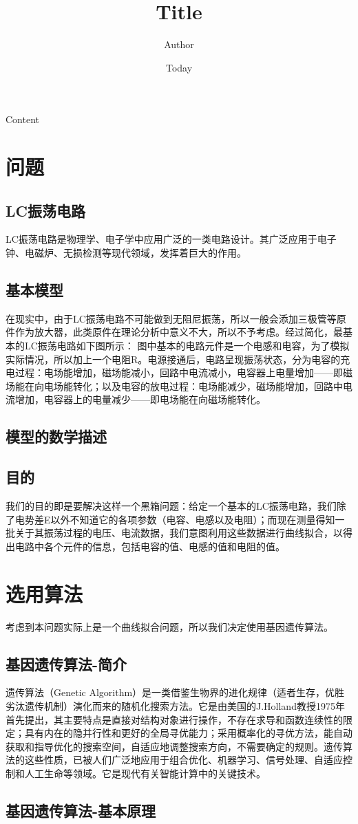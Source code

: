 \documentclass[a4paper]{article}
\begin{document}
\title{Title}
\author{Author}
\date{Today}
\maketitle

Content
\section{问题}
\subsection{LC振荡电路}
LC振荡电路是物理学、电子学中应用广泛的一类电路设计。其广泛应用于电子钟、电磁炉、无损检测等现代领域，发挥着巨大的作用。
\subsection{基本模型}
在现实中，由于LC振荡电路不可能做到无阻尼振荡，所以一般会添加三极管等原件作为放大器，此类原件在理论分析中意义不大，所以不予考虑。经过简化，最基本的LC振荡电路如下图所示：
图中基本的电路元件是一个电感和电容，为了模拟实际情况，所以加上一个电阻R。电源接通后，电路呈现振荡状态，分为电容的充电过程：电场能增加，磁场能减小，回路中电流减小，电容器上电量增加——即磁场能在向电场能转化；以及电容的放电过程：电场能减少，磁场能增加，回路中电流增加，电容器上的电量减少——即电场能在向磁场能转化。
\subsection{模型的数学描述}
\subsection{目的}
我们的目的即是要解决这样一个黑箱问题：给定一个基本的LC振荡电路，我们除了电势差E以外不知道它的各项参数（电容、电感以及电阻）；而现在测量得知一批关于其振荡过程的电压、电流数据，我们意图利用这些数据进行曲线拟合，以得出电路中各个元件的信息，包括电容的值、电感的值和电阻的值。

\section{选用算法}
考虑到本问题实际上是一个曲线拟合问题，所以我们决定使用基因遗传算法。
\subsection{基因遗传算法-简介}
遗传算法（Genetic Algorithm）是一类借鉴生物界的进化规律（适者生存，优胜劣汰遗传机制）演化而来的随机化搜索方法。它是由美国的J.Holland教授1975年首先提出，其主要特点是直接对结构对象进行操作，不存在求导和函数连续性的限定；具有内在的隐并行性和更好的全局寻优能力；采用概率化的寻优方法，能自动获取和指导优化的搜索空间，自适应地调整搜索方向，不需要确定的规则。遗传算法的这些性质，已被人们广泛地应用于组合优化、机器学习、信号处理、自适应控制和人工生命等领域。它是现代有关智能计算中的关键技术。
\subsection{基因遗传算法-基本原理}

\section{}
\end{document}
